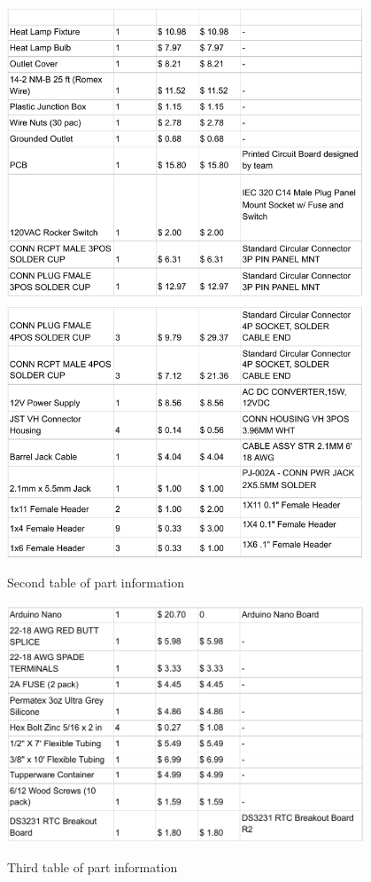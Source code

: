 \documentclass{article}
\begin{document}
\begin{table}[H]
    \centering
    \includegraphics[width=0.8\textwidth]{fig/part-info-2.pdf}
    \caption{Second table of part information}
    \label{fig:part-2}
\end{table}

\begin{table}[H]
    \centering
    \includegraphics[width=0.8\textwidth]{fig/part-info-3.pdf}
    \caption{Third table of part information}
    \label{fig:part-3}
\end{table}
\end{document}
